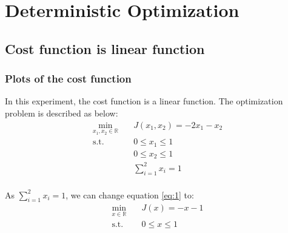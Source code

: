 \documentclass[a4paper,12pt]{article}
\begin{document}
\section{Deterministic Optimization}
\subsection{Cost function is linear function}
\subsubsection{Plots of the cost function }
In this experiment, the cost function is a linear function. The optimization problem is described as below:\\


\begin{equation}\label{eq:1}
\begin{aligned}
\min_{x_1,x_2\in \mathbb{R}} \quad & J(x_1,x_2) = -2x_1-x_2\\
\textrm{s.t.} \quad & 0 \leq x_1 \leq 1\\
              \quad & 0 \leq x_2 \leq 1\\
              \quad & \sum_{i=1}^{2} x_i = 1\\
\end{aligned}
\end{equation}


As $\sum_{i=1}^{2} x_i = 1$, we can change equation \ref{eq:1} to:\\
\begin{equation}\label{eq:2}
\begin{aligned}
\min_{x\in \mathbb{R}} \quad & J(x) = -x-1\\
\textrm{s.t.} \quad & 0 \leq x \leq 1\\
\end{aligned}
\end{equation}
\end{document}
